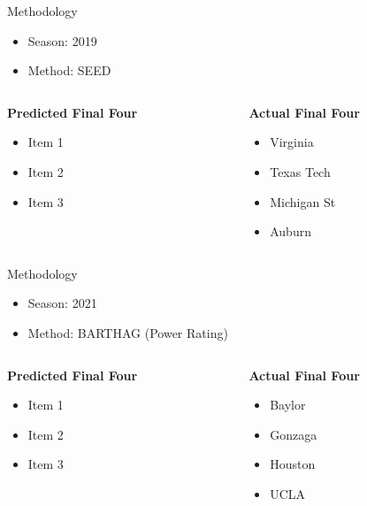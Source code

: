 \documentclass{beamer}
\begin{document}
\begin{frame}{Methodology}
\begin{itemize}
  \item Season: 2019
  \item Method: SEED
\end{itemize}

\begin{columns}[T] %
\begin{column}{0.5\textwidth} %
  \textbf{Predicted Final Four}
  \begin{itemize}
    \item Item 1
    \item Item 2
    \item Item 3
  \end{itemize}
\end{column}
\begin{column}{0.5\textwidth} %
  \textbf{Actual Final Four}
  \begin{itemize}
    \item Virginia
    \item Texas Tech
    \item Michigan St
    \item Auburn
  \end{itemize}
\end{column}
\end{columns}
\end{frame}

\begin{frame}{Methodology}
\begin{itemize}
  \item Season: 2021
  \item Method: BARTHAG (Power Rating)
\end{itemize}

\begin{columns}[T] %
\begin{column}{0.5\textwidth} %
  \textbf{Predicted Final Four}
  \begin{itemize}
    \item Item 1
    \item Item 2
    \item Item 3
  \end{itemize}
\end{column}
\begin{column}{0.5\textwidth} %
  \textbf{Actual Final Four}
  \begin{itemize}
    \item Baylor
    \item Gonzaga
    \item Houston
    \item UCLA
  \end{itemize}
\end{column}
\end{columns}
\end{frame}
\end{document}
